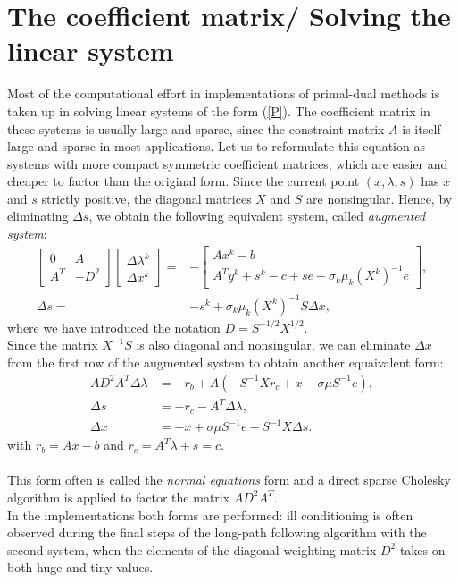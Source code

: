 \documentclass[a4paper,10 pt,titlepage,twoside]{book}
\theoremstyle{plain}
\theoremstyle{definition}
\theoremstyle{remark}
\begin{document}
\section*{The coefficient matrix/ Solving the linear system}
Most of the computational effort in implementations of primal-dual methods is taken up in solving linear systems of the form (\ref{P}). The
coefficient matrix in these systems is usually large and sparse, since the constraint
matrix $A$ is itself large and sparse in most applications. Let us to reformulate
this equation as systems with more compact symmetric coefficient matrices, which
are easier and cheaper to factor than the original form. Since the current point $(x, \lambda, s)$ has $x$ and $s$ strictly
positive, the diagonal matrices $X$ and $S$ are nonsingular. Hence, by eliminating $\Delta s$, we obtain the following equivalent system, called \textit{augmented system}:
\begin{align*}
\begin{bmatrix}
0&A\\A^{T}&-D^{2}
\end{bmatrix}\begin{bmatrix}
\Delta\lambda^{k} \\\Delta x^{k}
\end{bmatrix}=&-\begin{bmatrix}
Ax^{k}-b\\A^{T}y^{k}+s^{k}-c+ se + \sigma_{k}\mu_{k}(X^{k})^{-1}e
\end{bmatrix},\\
\Delta s =& -s^{k} +\sigma_{k}\mu_{k} (X^{k})^{-1}S\Delta x,
\end{align*}
where we have introduced the notation $D = S^{-1/2}X^{1/2}$.\\
Since the matrix $X^{-1}S$ is also diagonal and nonsingular, we can eliminate $\Delta x$ from the first row of the augmented system to obtain another equaivalent form:
\begin{align*}
AD^{2}A^{T}\Delta\lambda &= -r_{b}+A(-S^{-1}Xr_{c}+ x - \sigma\mu S^{-1}e),\\
\Delta s &= -r_{c}-A^{T}\Delta \lambda,\\
\Delta x &= -x + \sigma \mu S^{-1}e-S^{-1}X\Delta s.
\end{align*}
with $r_{b} = Ax - b$ and $r_{c}= A^{T}\lambda +s = c$.\\
\\
This form often is called the \textit{normal equations} form and a direct sparse Cholesky algorithm is applied to factor the matrix $AD^{2}A^{T}$. \\In the implementations both forms are performed: ill conditioning is often observed during the final
steps of the long-path following algorithm with the second system, when the elements of the diagonal weighting
matrix $D^{2}$ takes on both huge and tiny values.
\end{document}
